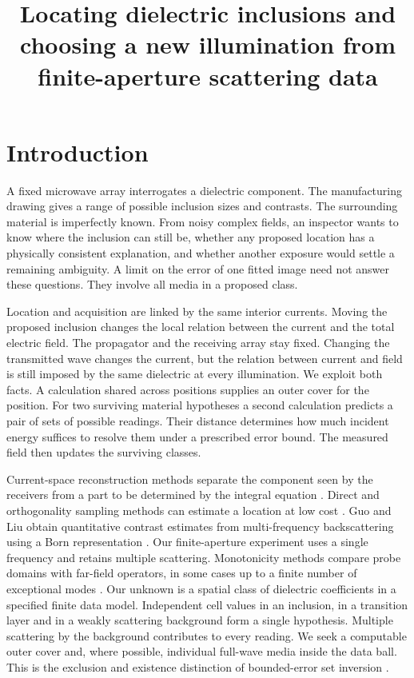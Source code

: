 \documentclass[anonymous,12pt]{iopjournal}
\numberwithin{equation}{section}
\begin{document}
\par\vspace{1.6ex}
\title{Locating dielectric inclusions and choosing a new illumination from finite-aperture scattering data}
\author{}

\par\smallskip
{}
\section{Introduction}\label{sec:intro}
A fixed microwave array interrogates a dielectric component. The manufacturing drawing gives a range of possible inclusion sizes and contrasts. The surrounding material is imperfectly known. From noisy complex fields, an inspector wants to know where the inclusion can still be, whether any proposed location has a physically consistent explanation, and whether another exposure would settle a remaining ambiguity. A limit on the error of one fitted image need not answer these questions. They involve all media in a proposed class.

Location and acquisition are linked by the same interior currents. Moving the proposed inclusion changes the local relation between the current and the total electric field. The propagator and the receiving array stay fixed. Changing the transmitted wave changes the current, but the relation between current and field is still imposed by the same dielectric at every illumination. We exploit both facts. A calculation shared across positions supplies an outer cover for the position. For two surviving material hypotheses a second calculation predicts a pair of sets of possible readings. Their distance determines how much incident energy suffices to resolve them under a prescribed error bound. The measured field then updates the surviving classes.

Current-space reconstruction methods separate the component seen by the receivers from a part to be determined by the integral equation \cite{chen,zhong,ffttsom}. Direct and orthogonality sampling methods can estimate a location at low cost \cite{potthast}. Guo and Liu obtain quantitative contrast estimates from multi-frequency backscattering using a Born representation \cite{guoliu}. Our finite-aperture experiment uses a single frequency and retains multiple scattering. Monotonicity methods compare probe domains with far-field operators, in some cases up to a finite number of exceptional modes \cite{griesmaier_harrach,griesmaier_harrach_erratum,albicker}. Our unknown is a spatial class of dielectric coefficients in a specified finite data model. Independent cell values in an inclusion, in a transition layer and in a weakly scattering background form a single hypothesis. Multiple scattering by the background contributes to every reading. We seek a computable outer cover and, where possible, individual full-wave media inside the data ball. This is the exclusion and existence distinction of bounded-error set inversion \cite{sivia}.
\end{document}
